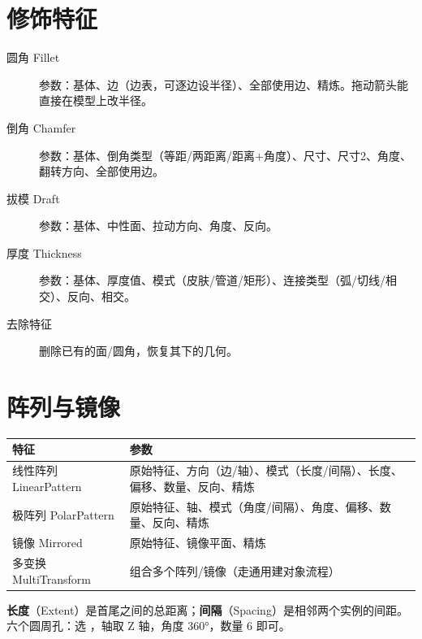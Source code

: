 \section{修饰特征}

\begin{description}
  \item[圆角 Fillet] 参数：基体、边（边表，可逐边设半径）、全部使用边、精炼。拖动箭头能直接在模型上改半径。
  \item[倒角 Chamfer] 参数：基体、倒角类型（等距/两距离/距离+角度）、尺寸、尺寸2、角度、翻转方向、全部使用边。
  \item[拔模 Draft] 参数：基体、中性面、拉动方向、角度、反向。
  \item[厚度 Thickness] 参数：基体、厚度值、模式（皮肤/管道/矩形）、连接类型（弧/切线/相交）、反向、相交。
  \item[去除特征] 删除已有的面/圆角，恢复其下的几何。
\end{description}


\section{阵列与镜像}

\begin{center}
\small
\begin{tabularx}{\linewidth}{@{}lX@{}}
\toprule
\textbf{特征} & \textbf{参数} \\
\midrule
线性阵列 LinearPattern & 原始特征、方向（边/轴）、模式（长度/间隔）、长度、偏移、数量、反向、精炼 \\
极阵列 PolarPattern & 原始特征、轴、模式（角度/间隔）、角度、偏移、数量、反向、精炼 \\
镜像 Mirrored & 原始特征、镜像平面、精炼 \\
多变换 MultiTransform & 组合多个阵列/镜像（走通用建对象流程）\\
\bottomrule
\end{tabularx}
\end{center}

\begin{tip}[阵列的“长度 vs 间隔”]
\textbf{长度}（Extent）是首尾之间的总距离；\textbf{间隔}（Spacing）是相邻两个实例的间距。
六个圆周孔：选 ，轴取 Z 轴，角度 360°，数量 6 即可。
\end{tip}

